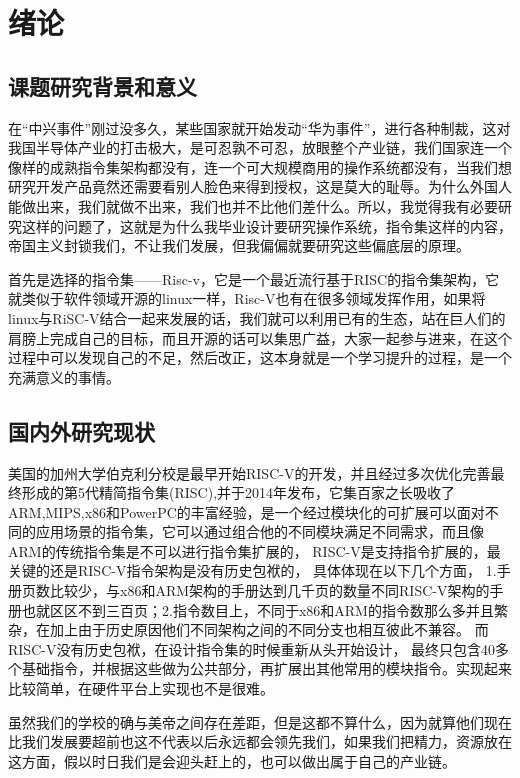 \section{绪论}
\subsection{课题研究背景和意义}
在“中兴事件”刚过没多久，某些国家就开始发动“华为事件”，进行各种制裁，这对我国半导体产业的打击极大，是可忍孰不可忍，放眼整个产业链，我们国家连一个像样的成熟指令集架构都没有，连一个可大规模商用的操作系统都没有，当我们想研究开发产品竟然还需要看别人脸色来得到授权，这是莫大的耻辱。为什么外国人能做出来，我们就做不出来，我们也并不比他们差什么。所以，我觉得我有必要研究这样的问题了，这就是为什么我毕业设计要研究操作系统，指令集这样的内容，帝国主义封锁我们，不让我们发展，但我偏偏就要研究这些偏底层的原理。

首先是选择的指令集——Risc-v，它是一个最近流行基于RISC的指令集架构，它就类似于软件领域开源的linux一样，Risc-V也有在很多领域发挥作用，如果将linux与RiSC-V结合一起来发展的话，我们就可以利用已有的生态，站在巨人们的肩膀上完成自己的目标，而且开源的话可以集思广益，大家一起参与进来，在这个过程中可以发现自己的不足，然后改正，这本身就是一个学习提升的过程，是一个充满意义的事情。


\subsection{国内外研究现状}
美国的加州大学伯克利分校是最早开始RISC-V的开发，并且经过多次优化完善最终形成的第5代精简指令集(RISC),并于2014年发布，它集百家之长吸收了ARM,MIPS,x86和PowerPC的丰富经验，是一个经过模块化的可扩展可以面对不同的应用场景的指令集，它可以通过组合他的不同模块满足不同需求，而且像ARM的传统指令集是不可以进行指令集扩展的，
RISC-V是支持指令扩展的，最关键的还是RISC-V指令架构是没有历史包袱的，
具体体现在以下几个方面，
1.手册页数比较少，与x86和ARM架构的手册达到几千页的数量不同RISC-V架构的手册也就区区不到三百页；2.指令数目上，不同于x86和ARM的指令数那么多并且繁杂，在加上由于历史原因他们不同架构之间的不同分支也相互彼此不兼容。
而RISC-V没有历史包袱，在设计指令集的时候重新从头开始设计，
最终只包含40多个基础指令，并根据这些做为公共部分，再扩展出其他常用的模块指令。实现起来比较简单，在硬件平台上实现也不是很难。

虽然我们的学校的确与美帝之间存在差距，但是这都不算什么，因为就算他们现在比我们发展要超前也这不代表以后永远都会领先我们，如果我们把精力，资源放在这方面，假以时日我们是会迎头赶上的，也可以做出属于自己的产业链。

